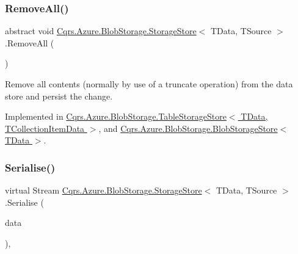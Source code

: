 \subsubsection{\texorpdfstring{Remove\+All()}{RemoveAll()}}
{\footnotesize\ttfamily abstract void \hyperlink{classCqrs_1_1Azure_1_1BlobStorage_1_1StorageStore}{Cqrs.\+Azure.\+Blob\+Storage.\+Storage\+Store}$<$ T\+Data, T\+Source $>$.Remove\+All (\begin{DoxyParamCaption}{ }\end{DoxyParamCaption})\hspace{0.3cm}{\ttfamily [pure virtual]}}



Remove all contents (normally by use of a truncate operation) from the data store and persist the change. 



Implemented in \hyperlink{classCqrs_1_1Azure_1_1BlobStorage_1_1TableStorageStore_aadd66b35bfa105ef4446bd791e99a3d5_aadd66b35bfa105ef4446bd791e99a3d5}{Cqrs.\+Azure.\+Blob\+Storage.\+Table\+Storage\+Store$<$ T\+Data, T\+Collection\+Item\+Data $>$}, and \hyperlink{classCqrs_1_1Azure_1_1BlobStorage_1_1BlobStorageStore_a4371b95250e51b8462d8ab33b6f3fe9e_a4371b95250e51b8462d8ab33b6f3fe9e}{Cqrs.\+Azure.\+Blob\+Storage.\+Blob\+Storage\+Store$<$ T\+Data $>$}.

\mbox{\label{classCqrs_1_1Azure_1_1BlobStorage_1_1StorageStore_a8e5d4e50e054d963f96aaa4808794718_a8e5d4e50e054d963f96aaa4808794718}} 
\subsubsection{\texorpdfstring{Serialise()}{Serialise()}}
{\footnotesize\ttfamily virtual Stream \hyperlink{classCqrs_1_1Azure_1_1BlobStorage_1_1StorageStore}{Cqrs.\+Azure.\+Blob\+Storage.\+Storage\+Store}$<$ T\+Data, T\+Source $>$.Serialise (\begin{DoxyParamCaption}\item[{T\+Data}]{data }\end{DoxyParamCaption})\hspace{0.3cm}{\ttfamily [protected]}, {\ttfamily [virtual]}}




